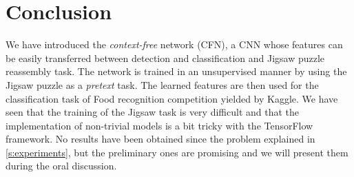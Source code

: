 \section{Conclusion}
We have introduced the \emph{context-free} network (CFN), a CNN whose features can be easily transferred between detection and classification and Jigsaw puzzle reassembly task. The network is trained in an unsupervised manner by using the Jigsaw puzzle as a \emph{pretext} task. The learned features are then used for the classification task of Food recognition competition yielded by Kaggle. We have seen that the training of the Jigsaw task is very difficult and that the implementation of non-trivial models is a bit tricky with the TensorFlow framework. No results have been obtained since the problem explained in \ref{s:experiments}, but the preliminary ones are promising and we will present them during the oral discussion.
